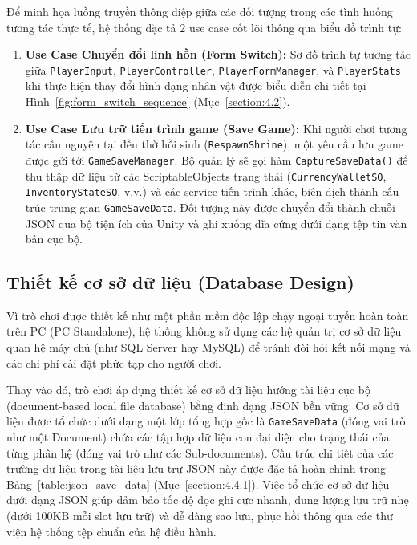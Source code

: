 \documentclass[../DoAn.tex]{subfiles}
\begin{document}
Để minh họa luồng truyền thông điệp giữa các đối tượng trong các tình huống tương tác thực tế, hệ thống đặc tả 2 use case cốt lõi thông qua biểu đồ trình tự:
\begin{enumerate}
    \item \textbf{Use Case Chuyển đổi linh hồn (Form Switch):} Sơ đồ trình tự tương tác giữa \texttt{PlayerInput}, \texttt{PlayerController}, \texttt{PlayerFormManager}, và \texttt{PlayerStats} khi thực hiện thay đổi hình dạng nhân vật được biểu diễn chi tiết tại Hình~\ref{fig:form_switch_sequence} (Mục~\ref{section:4.2}).
    \item \textbf{Use Case Lưu trữ tiến trình game (Save Game):} Khi người chơi tương tác cầu nguyện tại đền thờ hồi sinh (\texttt{RespawnShrine}), một yêu cầu lưu game được gửi tới \texttt{GameSaveManager}. Bộ quản lý sẽ gọi hàm \texttt{CaptureSaveData()} để thu thập dữ liệu từ các ScriptableObjects trạng thái (\texttt{CurrencyWalletSO}, \texttt{InventoryStateSO}, v.v.) và các service tiến trình khác, biên dịch thành cấu trúc trung gian \texttt{GameSaveData}. Đối tượng này được chuyển đổi thành chuỗi JSON qua bộ tiện ích của Unity và ghi xuống đĩa cứng dưới dạng tệp tin văn bản cục bộ.
\end{enumerate}

\subsection{Thiết kế cơ sở dữ liệu (Database Design)}
Vì trò chơi được thiết kế như một phần mềm độc lập chạy ngoại tuyến hoàn toàn trên PC (PC Standalone), hệ thống không sử dụng các hệ quản trị cơ sở dữ liệu quan hệ máy chủ (như SQL Server hay MySQL) để tránh đòi hỏi kết nối mạng và các chi phí cài đặt phức tạp cho người chơi.

Thay vào đó, trò chơi áp dụng thiết kế cơ sở dữ liệu hướng tài liệu cục bộ (document-based local file database) bằng định dạng JSON bền vững. Cơ sở dữ liệu được tổ chức dưới dạng một lớp tổng hợp gốc là \texttt{GameSaveData} (đóng vai trò như một Document) chứa các tập hợp dữ liệu con đại diện cho trạng thái của từng phân hệ (đóng vai trò như các Sub-documents). Cấu trúc chi tiết của các trường dữ liệu trong tài liệu lưu trữ JSON này được đặc tả hoàn chỉnh trong Bảng~\ref{table:json_save_data} (Mục~\ref{section:4.4.1}). Việc tổ chức cơ sở dữ liệu dưới dạng JSON giúp đảm bảo tốc độ đọc ghi cực nhanh, dung lượng lưu trữ nhẹ (dưới 100KB mỗi slot lưu trữ) và dễ dàng sao lưu, phục hồi thông qua các thư viện hệ thống tệp chuẩn của hệ điều hành.
\end{document}
